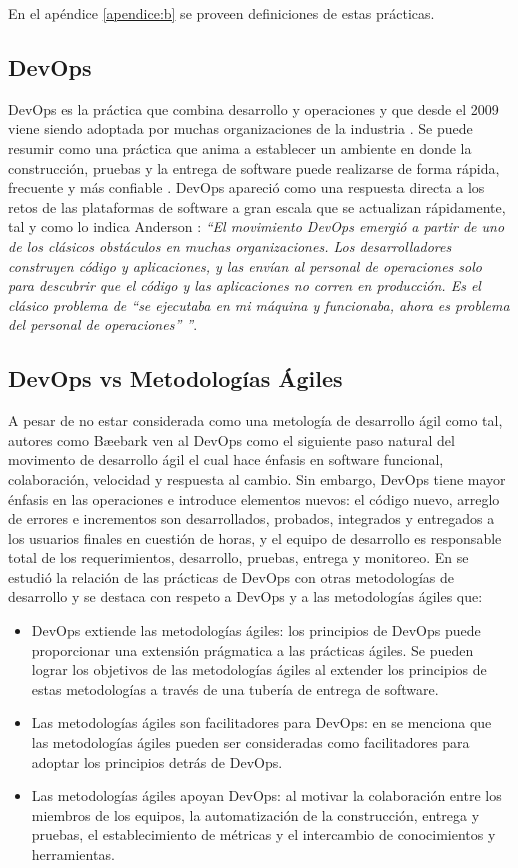 \documentclass[journal]{IEEEtran}
\begin{document}
En el apéndice \ref{apendice:b} se proveen definiciones de estas prácticas.

\subsection{DevOps}
DevOps es la práctica que combina desarrollo y operaciones y que desde el 2009 viene siendo adoptada por muchas organizaciones de la industria \cite{bang-et-al}. Se puede resumir como una práctica que anima a establecer un ambiente en donde la construcción, pruebas y la entrega de software puede realizarse de forma rápida, frecuente y más confiable \cite{henrik-b}. DevOps apareció como una respuesta directa a los retos de las plataformas de software a gran escala que se actualizan rápidamente, tal y como lo indica Anderson \cite{anderson}: \emph{``El movimiento DevOps emergió a partir de uno de los clásicos obstáculos en muchas organizaciones. Los desarrolladores construyen código y aplicaciones, y las envían al personal de operaciones solo para descubrir que el código y las aplicaciones no corren en producción. Es el clásico problema de ``se ejecutaba en mi máquina y funcionaba, ahora es problema del personal de operaciones'' ''}. 

\subsection{DevOps vs Metodologías Ágiles}
A pesar de no estar considerada como una metología de desarrollo ágil como tal, autores como Bæebark \cite{henrik-b} ven al DevOps como el siguiente paso natural del movimento de desarrollo ágil el cual hace énfasis en software funcional, colaboración, velocidad y respuesta al cambio. Sin embargo, DevOps tiene mayor énfasis en las operaciones e introduce elementos nuevos: el código nuevo, arreglo de errores e incrementos son desarrollados, probados, integrados y entregados a los usuarios finales en cuestión de horas, y el equipo de desarrollo es responsable total de los requerimientos, desarrollo, pruebas, entrega y monitoreo. En \cite{jabbari-et-al} se estudió la relación de las prácticas de DevOps con otras metodologías de desarrollo y se destaca con respeto a DevOps y a las metodologías ágiles que:
\begin{itemize}
    \item DevOps extiende las metodologías ágiles: los principios de DevOps puede proporcionar una extensión prágmatica a las prácticas ágiles. Se pueden lograr los objetivos de las metodologías ágiles al extender los principios de estas metodologías a través de una tubería de entrega de software.
    \item Las metodologías ágiles son facilitadores para DevOps: en \cite{jabbari-et-al} se menciona que las metodologías ágiles pueden ser consideradas como facilitadores para adoptar los principios detrás de DevOps.
    \item Las metodologías ágiles apoyan DevOps: al motivar la colaboración entre los miembros de los equipos, la automatización de la construcción, entrega y pruebas, el establecimiento de métricas y el intercambio de conocimientos y herramientas. 
\end{itemize}
\end{document}
